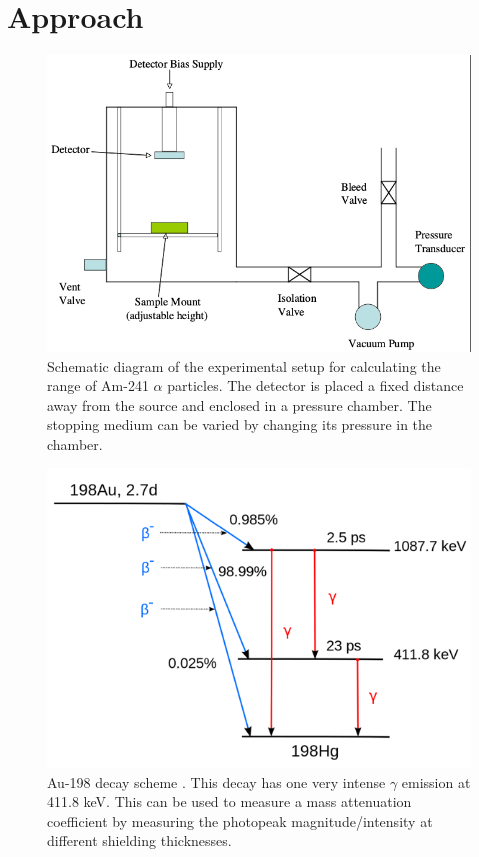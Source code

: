 \section{Approach}

\begin{figure}[t!]
\centering
\includegraphics[scale=0.5]{alpha_setup.png}
\caption{Schematic diagram of the experimental setup for calculating the range of Am-241 $\alpha$ particles. The detector is placed a fixed distance away from the source and enclosed in a pressure chamber. The stopping medium can be varied by changing its pressure in the chamber.}
\label{fig:alpha-setup}
\end{figure}

\begin{figure}
\centering
\includegraphics[scale=0.5]{au198.png}
\caption{Au-198 decay scheme \cite{dataset}. This decay has one very intense $\gamma$ emission at 411.8 keV. This can be used to measure a mass attenuation coefficient by measuring the photopeak magnitude/intensity at different shielding thicknesses.}
\label{fig:au198}
\end{figure}

